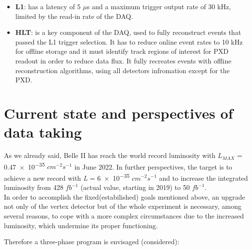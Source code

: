 \begin{itemize}
\item \textbf{L1}: has a latency of 5 $\mu$s and a maximum trigger output rate of 30 kHz, limited by the read-in rate of the DAQ.
\item \textbf{HLT}: is a key component of the DAQ, used to fully reconstruct events that passed the L1 trigger selection. It has to reduce online event rates to 10 kHz for offline storage and it must identify track regions of interest for PXD readout in order to reduce data flux. It fully recreates events with offline reconstruction algorithms, using all detectors infromation except for the PXD.
\end{itemize}


\begin{comment}
\begin{figure}
\centering
\texttt{[image: detector\_summary]}
\caption{}
\label{}
\end{figure}
\end{comment}


\section{Current state and perspectives of data taking}

As we already said, Belle II has reach the world record luminosity with $\textit{L}_{MAX}$ = \num{0.47e-35} $cm^{-2}s^{-1}$ in June 2022. In further perspectives, the target is to achieve a new record with \textit{L} = \num{6e-35} $cm^{-2}s^{-1}$ and to increase the integrated luminosity from 428 $fb^{-1}$ (actual value, starting in 2019) to 50 $fb^{-1}$. \\

In order to accomplish the fixed(estabilished) goals mentioned above, an upgrade not only of the vertex detector but of the whole experiment is necessary, among several reasons, to cope with a more complex circumstances due to the increased luminosity, which undermine its proper functioning.

Therefore a three-phase program is envisaged (considered):

